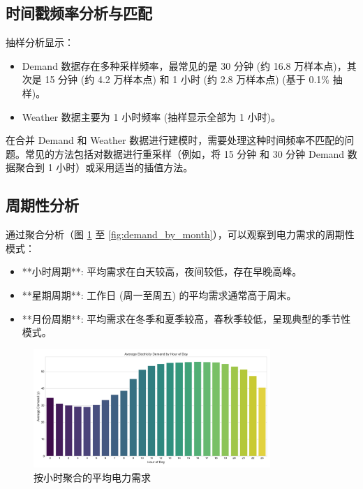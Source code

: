 \documentclass{article} %
\begin{document}
\subsection{时间戳频率分析与匹配}
\label{sec:frequency_matching}
抽样分析显示：
\begin{itemize}
    \item Demand 数据存在多种采样频率，最常见的是 30 分钟 (约 16.8 万样本点)，其次是 15 分钟 (约 4.2 万样本点) 和 1 小时 (约 2.8 万样本点) (基于 0.1\% 抽样)。
    \item Weather 数据主要为 1 小时频率 (抽样显示全部为 1 小时)。
\end{itemize}
在合并 Demand 和 Weather 数据进行建模时，需要处理这种时间频率不匹配的问题。常见的方法包括对数据进行重采样（例如，将 15 分钟 和 30 分钟 Demand 数据聚合到 1 小时）或采用适当的插值方法。

\subsection{周期性分析}
\label{sec:periodicity_analysis}
通过聚合分析（图 \ref{fig:demand_by_hour} 至 \ref{fig:demand_by_month}），可以观察到电力需求的周期性模式：
\begin{itemize}
    \item **小时周期**: 平均需求在白天较高，夜间较低，存在早晚高峰。
    \item **星期周期**: 工作日 (周一至周五) 的平均需求通常高于周末。
    \item **月份周期**: 平均需求在冬季和夏季较高，春秋季较低，呈现典型的季节性模式。
\end{itemize}

\begin{figure}[H]
    \centering
    \includegraphics[width=0.8\textwidth]{../plots/avg_demand_by_hour_spark.png}
    \caption{按小时聚合的平均电力需求}
    \label{fig:demand_by_hour}
\end{figure}
\end{document}
